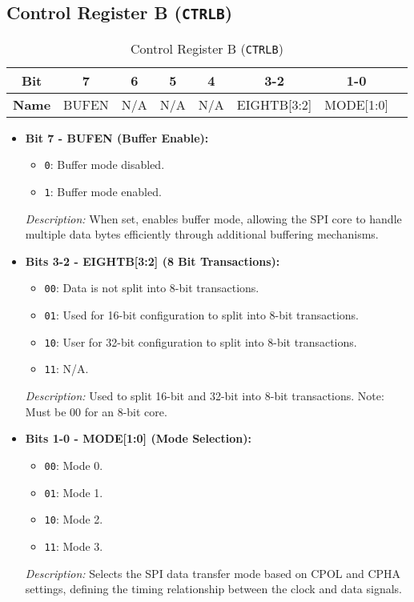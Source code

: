   \subsection{Control Register B (\texttt{CTRLB})}
  \label{sec:ctrlb}
  
  \begin{table}[H]
      \centering
      \caption{Control Register B (\texttt{CTRLB})}
      \begin{tabular}{@{}cccccccc@{}}
          \toprule
          \textbf{Bit} & 7 & 6 & 5 & 4 & 3-2 & 1-0 \\ \midrule
          \textbf{Name} & BUFEN & N/A & N/A & N/A & EIGHTB[3:2] & MODE[1:0] \\ \bottomrule
      \end{tabular}
      \label{tab:ctrl_b}
  \end{table}
  
  
  \begin{itemize}
      \item \textbf{Bit 7 - BUFEN (Buffer Enable):} 
      \begin{itemize}
          \item \texttt{0}: Buffer mode disabled.
          \item \texttt{1}: Buffer mode enabled.
      \end{itemize}
      \textit{Description:} When set, enables buffer mode, allowing the SPI core to handle multiple data bytes efficiently through additional buffering mechanisms.
      
      \item \textbf{Bits 3-2 - EIGHTB[3:2] (8 Bit Transactions):} 
      \begin{itemize}
          \item \texttt{00}: Data is not split into 8-bit transactions.
          \item \texttt{01}: Used for 16-bit configuration to split into 8-bit transactions.
          \item \texttt{10}: User for 32-bit configuration to split into 8-bit transactions.
          \item \texttt{11}: N/A.
      \end{itemize}
      \textit{Description:} Used to split 16-bit and 32-bit into 8-bit transactions. Note: Must be 00 for an 8-bit core.

      \item \textbf{Bits 1-0 - MODE[1:0] (Mode Selection):} 
      \begin{itemize}
          \item \texttt{00}: Mode 0.
          \item \texttt{01}: Mode 1.
          \item \texttt{10}: Mode 2.
          \item \texttt{11}: Mode 3.
      \end{itemize}
      \textit{Description:} Selects the SPI data transfer mode based on CPOL and CPHA settings, defining the timing relationship between the clock and data signals.
  \end{itemize}
  
